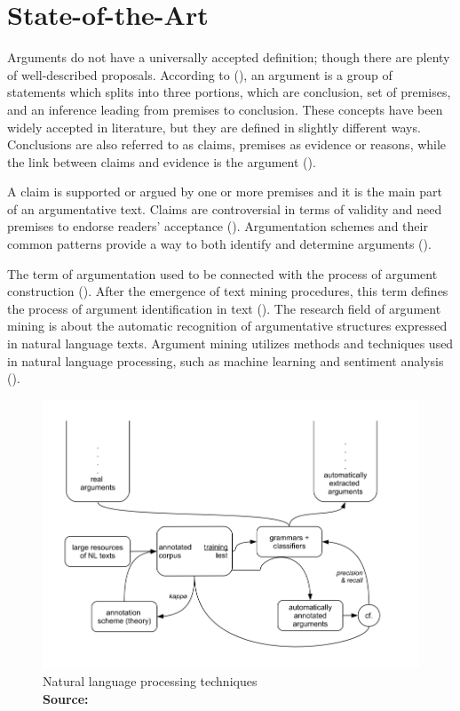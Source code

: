\chapter{State-of-the-Art}

\label{Chapter2}

Arguments do not have a universally accepted definition; though there are plenty of well-described proposals. According to (\cite{Walton2009ArgumentationTA}), an argument is a group of statements which splits into three portions, which are conclusion, set of premises, and an inference leading from premises to conclusion. These concepts have been widely accepted in literature, but they are defined in slightly different ways. Conclusions are also referred to as claims, premises as evidence or reasons, while the link between claims and evidence is the argument (\cite{Lippi2015}). \par

A claim is supported or argued by one or more premises and it is the main part of an argumentative text. Claims are controversial in terms of validity and need premises to endorse readers' acceptance (\cite{Stab2014}). Argumentation schemes and their common patterns provide a way to both identify and determine arguments (\cite{Lawrence2015}). \par

The term of argumentation used to be connected with the process of argument construction (\cite{Lippi2016}). 	After the emergence of text mining procedures, this term defines the process of argument identification in text (\cite{Lippi2016}). The research field of argument mining is about the automatic recognition of argumentative structures expressed in natural language texts. Argument mining utilizes methods and techniques used in natural language processing, such as machine learning and sentiment analysis (\cite{Lippi2015}). \par

\begin{figure}[!h]
	\begin{center}
		\includegraphics[scale=0.45]{images/NLP_techniques.png}
	\end{center}
	\caption{
		Natural language processing techniques
		\\
		\textbf{Source:} \cite{Budzynska2015}
	}
	\label{NLP_techniques}
\end{figure}

